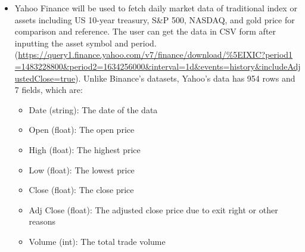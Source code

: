 \documentclass[a4paper]{article}
\begin{document}
\begin{itemize}
\begin{itemize}
    \end{itemize}
    \item Yahoo Finance will be used to fetch daily market data of traditional index or assets including US 10-year treasury, S\&P 500, NASDAQ, and gold price for comparison and reference. The user can get the data in CSV form after inputting the asset symbol and period. (\href{https://query1.finance.yahoo.com/v7/finance/download/%5EIXIC?period1=1483228800&period2=1634256000&interval=1d&events=history&includeAdjustedClose=true}{https://query1.finance.yahoo.com/v7/finance/download/\%5EIXIC?period1\\=1483228800\&period2=1634256000\&interval=1d\&events=history\&includeAdjustedClose=true}). Unlike Binance’s datasets, Yahoo’s data has 954 rows and 7 fields, which are:
    \begin{itemize}
        \item Date (string): The date of the data
        \item Open (float): The open price
        \item High (float): The highest price
        \item Low (float): The lowest price
        \item Close (float): The close price 
        \item Adj Close (float): The adjusted close price due to exit right or other reasons
        \item Volume (int): The total trade volume
    \end{itemize}
\end{itemize}
\end{document}
